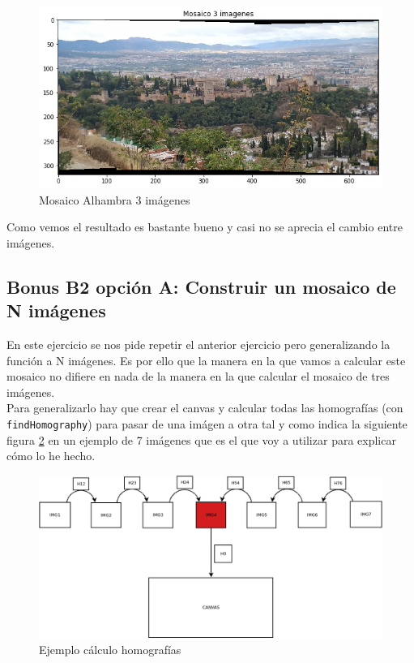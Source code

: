 \documentclass[12pt,spanish]{article}
\begin{document}
\begin{figure}[H]
	\centering
	\includegraphics[width=12cm]{./imagenes_memoria/mosaico3.png}
	\caption{Mosaico Alhambra 3 imágenes}
	\label{mosaico3}
\end{figure}

Como vemos el resultado es bastante bueno y casi no se aprecia el cambio entre imágenes.

\subsection{Bonus B2 opción A: Construir un mosaico de N imágenes}
En este ejercicio se nos pide repetir el anterior ejercicio pero generalizando la función a N imágenes. Es por ello que la manera en la que vamos a calcular este mosaico no difiere en nada de la manera en la que calcular el mosaico de tres imágenes. \\

Para generalizarlo hay que crear el canvas y calcular todas las homografías (con \texttt{findHomography}) para pasar de una imágen a otra tal y como indica la siguiente figura \ref{calculo_homografias} en un ejemplo de 7 imágenes que es el que voy a utilizar para explicar cómo lo he hecho.

\begin{figure}[H]
	\centering
	\includegraphics[width=12cm]{./imagenes_memoria/calchomo.png}
	\caption{Ejemplo cálculo homografías}
	\label{calculo_homografias}
\end{figure}
\end{document}
